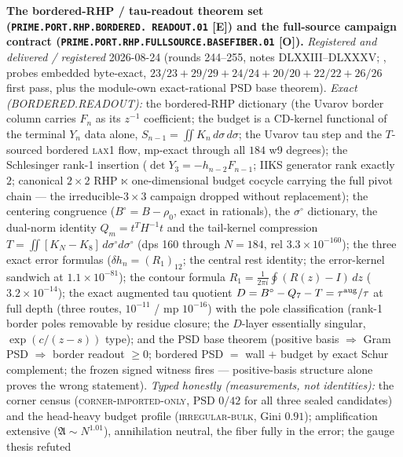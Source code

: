 \documentclass[11pt,a4paper]{article}
\begin{document}
\par\smallskip\noindent\textbf{The bordered-RHP / tau-readout
theorem set (\texttt{PRIME.PORT.RHP.BORDERED.\allowbreak
READOUT.01} [E]) and the full-source campaign contract
(\texttt{PRIME.PORT.RHP.FULLSOURCE.\allowbreak BASEFIBER.01}
[O]).}
{\sloppy
\emph{Registered and delivered / registered} 2026-08-24 (rounds
244--255, notes DLXXIII--DLXXXV;
, probes
embedded byte-exact, $23/23 + 29/29 + 24/24 + 20/20 + 22/22 +
26/26$ first pass, plus the module-own exact-rational PSD base
theorem).  \emph{Exact (BORDERED.READOUT):} the bordered-RHP
dictionary (the Uvarov border column carries $F_n$ as its
$z^{-1}$ coefficient; the budget is a CD-kernel functional of the
terminal $Y_n$ data alone, $S_{n-1} = \iint K_n\,d\sigma\,
d\sigma$; the Uvarov tau step and the $T$-sourced bordered
\textsc{lax1} flow, mp-exact through all $184$ w9 degrees); the
Schlesinger rank-1 insertion ($\det Y_3 = -h_{n-2}F_{n-1}$; IIKS
generator rank exactly $2$; canonical $2\times2$ RHP $\ltimes$
one-dimensional budget cocycle carrying the full pivot chain ---
the irreducible-$3\times3$ campaign dropped without replacement);
the centering congruence ($B^{\circ} = B - \rho_0$, exact in
rationals), the $\sigma^{\circ}$ dictionary, the dual-norm
identity $Q_m = t^{T}H^{-1}t$ and the tail-kernel compression
$T = \iint[K_N - K_8]\,d\sigma^{\circ}d\sigma^{\circ}$ (dps 160
through $N = 184$, rel $3.3\times10^{-160}$); the three exact
error formulas ($\delta h_n = (R_1)_{12}$; the central rest
identity; the error-kernel sandwich at $1.1\times10^{-81}$); the
contour formula $R_1 = \tfrac{1}{2\pi i}\oint(R(z) - I)\,dz$
($3.2\times10^{-14}$); the exact augmented tau quotient $D =
B^{\circ} - Q_7 - T = \tau^{\rm aug}/\tau$ at full depth (three
routes, $10^{-11}$ / mp $10^{-16}$) with the pole classification
(rank-1 border poles removable by residue closure; the $D$-layer
essentially singular, $\exp(c/(z-s))$ type); and the PSD base
theorem (positive basis $\Rightarrow$ Gram PSD $\Rightarrow$
border readout $\ge 0$; bordered PSD $=$ wall $+$ budget by exact
Schur complement; the frozen signed witness fires ---
positive-basis structure alone proves the wrong statement).
\emph{Typed honestly (measurements, not identities):} the corner
census (\textsc{corner-imported-only}, PSD $0/42$ for all three
sealed candidates) and the head-heavy budget profile
(\textsc{irregular-bulk}, Gini $0.91$); amplification extensive
($\mathfrak{A} \sim N^{1.01}$), annihilation neutral, the fiber
fully in the error; the gauge thesis refuted
}
\end{document}
